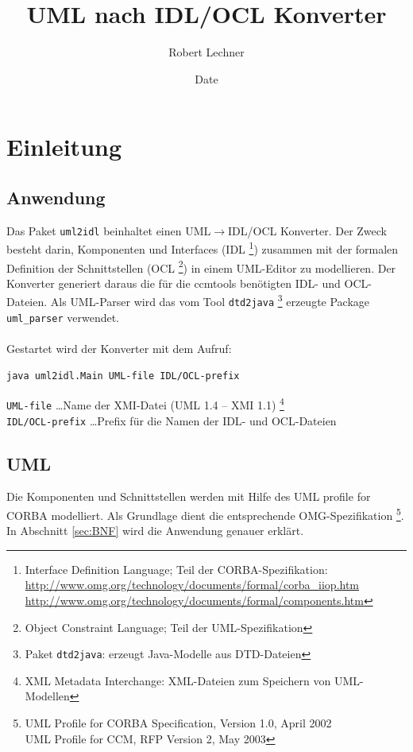 \documentclass [a4paper,10pt] {scrartcl}
\author{Robert Lechner}
\title{UML nach IDL/OCL Konverter}
\date{{\small $ $Date$ $}}
\begin{document}
\maketitle
\tableofcontents
\cleardoublepage

\section{Einleitung}
\subsection{Anwendung}
Das Paket \texttt{uml2idl} beinhaltet einen \textsf{UML}$\rightarrow$\textsf{IDL/OCL}
Konverter. Der Zweck besteht darin, Komponenten und Interfaces (\textsf{IDL}
\footnote{Interface Definition Language; Teil der CORBA-Spezifikation:\\
\url{http://www.omg.org/technology/documents/formal/corba_iiop.htm}\\
\url{http://www.omg.org/technology/documents/formal/components.htm}
}) zusammen mit der
formalen Definition der Schnittstellen (\textsf{OCL}
\footnote{Object Constraint Language; Teil der UML-Spezifikation}) in einem \textsf{UML}-Editor
zu modellieren. Der Konverter generiert daraus die f{\"u}r die \textsf{ccmtools} ben{\"o}tigten
\textsf{IDL}- und \textsf{OCL}-Dateien.
Als \textsf{UML}-Parser wird das vom Tool \texttt{dtd2java}
\footnote{Paket \texttt{dtd2java}: erzeugt Java-Modelle aus DTD-Dateien}
erzeugte Package \texttt{uml\_parser} verwendet. \\
~\\
Gestartet wird der Konverter mit dem Aufruf:
\begin{verbatim}
java uml2idl.Main UML-file IDL/OCL-prefix
\end{verbatim}
\texttt{UML-file} \dots Name der \textsf{XMI}-Datei (\textsf{UML} 1.4 -- \textsf{XMI} 1.1)
\footnote{XML Metadata Interchange: XML-Dateien zum Speichern von UML-Modellen}\\
\texttt{IDL/OCL-prefix} \dots Prefix f{\"u}r die Namen der \textsf{IDL}- und \textsf{OCL}-Dateien
\subsection{UML}
Die Komponenten und Schnittstellen werden mit Hilfe des \textsf{UML profile for CORBA}
modelliert. Als Grundlage dient die entsprechende \textsf{OMG}-Spezifikation
\footnote{UML Profile for CORBA Specification, Version 1.0, April 2002\\
UML Profile for CCM, RFP Version 2, May 2003}.\\
In Abschnitt \ref{sec:BNF} wird die Anwendung genauer erkl{\"a}rt.
\end{document}
